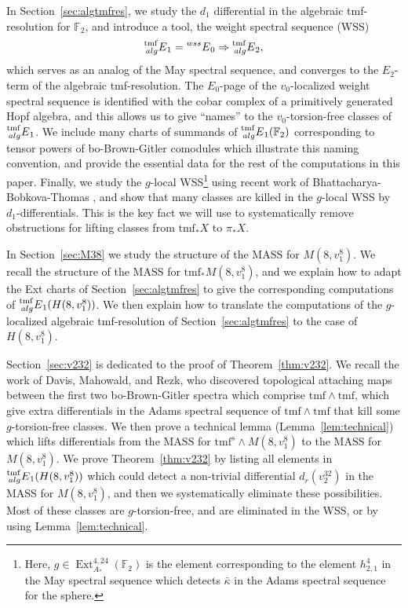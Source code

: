 \documentclass[10pt]{amsart}
\newcommand{\FF}{\mathbb{F}}
\newcommand{\tmf}{\mathrm{tmf}}
\theoremstyle{definition}
\numberwithin{equation}{section}
\numberwithin{figure}{section}
\DeclareMathOperator{\Ext}{Ext}
\newcommand{\E}[2]{\prescript{#1}{#2}{E}}
\begin{document}
In Section~\ref{sec:algtmfres}, we study the $d_1$ differential in the algebraic tmf-resolution for $\FF_2$, and introduce a tool, the weight spectral sequence (WSS) 
$$ \E{\tmf}{alg}_1 = \E{wss}{}_0 \Rightarrow \E{\tmf}{alg}_2, $$
which serves as an analog of the May spectral sequence, and converges to the $E_2$-term of the algebraic tmf-resolution.  The $E_0$-page of the $v_0$-localized weight spectral sequence is identified with the cobar complex of a primitively generated Hopf algebra, and this allows us to give ``names'' to the $v_0$-torsion-free classes of $\E{\tmf}{alg}_1$.  We include many charts of summands of $\E{\tmf}{alg}_1(\FF_2)$ corresponding to tensor powers of bo-Brown-Gitler comodules which illustrate this naming convention, and provide the essential data for the rest of the computations in this paper.  Finally, we study the $g$-local WSS\footnote{Here, $g \in \Ext^{4,24}_{A_*}(\FF_2)$ is the element corresponding to the element $h^4_{2,1}$ in the May spectral sequence which detects $\bar{\kappa}$ in the Adams spectral sequence for the sphere.} using recent work of Bhattacharya-Bobkova-Thomas \cite{BBT}, and show that many classes are killed in the $g$-local WSS by $d_1$-differentials.  This is the key fact we will use to systematically remove obstructions for lifting classes from $\tmf_*X$ to $\pi_*X$.

In Section~\ref{sec:M38} we study the structure of the MASS for $M(8,v_1^8)$.  We recall the structure of the MASS for $\tmf_*M(8,v_1^8)$, and we explain how to adapt the Ext charts of Section~\ref{sec:algtmfres} to give the corresponding computations of $\E{\tmf}{alg}_1(H(8,v_1^8))$. We then explain how to translate the computations of the $g$-localized algebraic tmf-resolution of Section~\ref{sec:algtmfres} to the case of $H(8,v_1^8)$.

Section~\ref{sec:v232} is dedicated to the proof of Theorem~\ref{thm:v232}.  We recall the work of Davis, Mahowald, and Rezk, who discovered topological attaching maps between the first two bo-Brown-Gitler spectra which comprise $\tmf \wedge \tmf$, which give extra differentials in the Adams spectral sequence of $\tmf \wedge \tmf$ that kill some $g$-torsion-free classes.  We then prove a technical lemma (Lemma~\ref{lem:technical}) which lifts differentials from the MASS for $\tmf^{s} \wedge M(8,v_1^8)$ to the MASS for $M(8,v_1^8)$.  We prove Theorem~\ref{thm:v232} by listing all elements in $\E{\tmf}{alg}_1(H(8,v_1^8))$ which could detect a non-trivial differential $d_r(v_2^{32})$ in the MASS for $M(8,v_1^8)$, and then we systematically eliminate these possibilities.  Most of these classes are $g$-torsion-free, and are eliminated in the WSS, or by using Lemma~\ref{lem:technical}.
\end{document}
